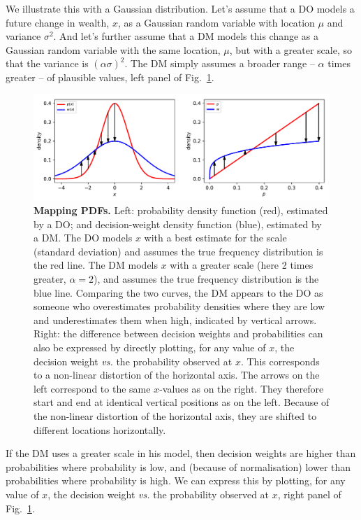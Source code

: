 \documentclass[a4paper, 12pt]{article}
\newcommand{\flabel}[1]{\label{fig:#1}}
\newcommand{\fref}[1]{Fig.~\ref{fig:#1}}
\newcommand{\vs}{\textit{vs.}\xspace}
\begin{document}
We illustrate this with a Gaussian distribution.
Let's assume that a DO models a future change in wealth, $x$, as a Gaussian random variable with location $\mu$ and variance $\sigma^2$. And let's further assume that a DM models this change as a Gaussian random variable with the same location, $\mu$, but with a greater scale, so that the variance is $(\alpha\sigma)^2$. The DM simply assumes a broader range -- $\alpha$ times greater -- of plausible values, left panel of \fref{mapping_pdfs}.
\begin{figure}[!htb]
\centering
\includegraphics[width=\textwidth]{./figs/mapping_pdfs.pdf}
\caption{\textbf{Mapping PDFs.} Left: probability density function (red), estimated by a DO; and decision-weight density function (blue), estimated by a DM. The DO models $x$ with a best estimate for the scale (standard deviation) and assumes the true frequency distribution is the red line. The DM models $x$ with a greater scale (here 2 times greater, $\alpha=2$), and assumes the true frequency distribution is the blue line. Comparing the two curves, the DM appears to the DO as someone who overestimates probability densities where they are low and underestimates them when high, indicated by vertical arrows.
Right: the difference between decision weights and probabilities can also be expressed by directly plotting, for any value of $x$, the decision weight \vs the probability observed at $x$. This corresponds to a non-linear distortion of the horizontal axis. The arrows on the left correspond to the same $x$-values as on the right. They therefore start and end at identical vertical positions as on the left. Because of the non-linear distortion of the horizontal axis, they are shifted to different locations horizontally.}
\flabel{mapping_pdfs}
\end{figure}

If the DM uses a greater scale in his model, then decision weights are higher than probabilities where probability is low, and (because of normalisation) lower than probabilities where probability is high. 
We can express this by plotting, for any value of $x$, the decision weight \vs the probability observed at $x$, right panel of \fref{mapping_pdfs}.
\end{document}
